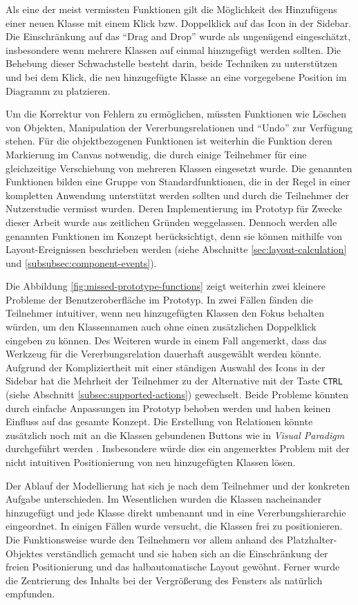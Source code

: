 Als eine der meist vermissten Funktionen gilt die Möglichkeit des Hinzufügens einer neuen Klasse mit einem Klick bzw. Doppelklick auf das Icon in der Sidebar. Die Einschränkung auf das \enquote{Drag and Drop} wurde als ungenügend eingeschätzt, insbesondere wenn mehrere Klassen auf einmal hinzugefügt werden sollten. Die Behebung dieser Schwachstelle besteht darin, beide Techniken zu unterstützen und bei dem Klick, die neu hinzugefügte Klasse an eine vorgegebene Position im Diagramm zu platzieren.

Um die Korrektur von Fehlern zu ermöglichen, müssten Funktionen wie Löschen von Objekten, Manipulation der Vererbungsrelationen und \enquote{Undo} zur Verfügung stehen. Für die objektbezogenen Funktionen ist weiterhin die Funktion deren Markierung im Canvas notwendig, die durch einige Teilnehmer für eine gleichzeitige Verschiebung von mehreren Klassen eingesetzt wurde. Die genannten Funktionen bilden eine Gruppe von Standardfunktionen, die in der Regel in einer kompletten Anwendung unterstützt werden sollten und durch die Teilnehmer der Nutzerstudie vermisst wurden. Deren Implementierung im Prototyp für Zwecke dieser Arbeit wurde aus zeitlichen Gründen weggelassen. Dennoch werden alle genannten Funktionen im Konzept berücksichtigt, denn sie können mithilfe von Layout-Ereignissen beschrieben werden (siehe Abschnitte \ref{sec:layout-calculation} und \ref{subsubsec:component-events}).

Die Abbildung \ref{fig:missed-prototype-functions} zeigt weiterhin zwei kleinere Probleme der Benutzeroberfläche im Prototyp. In zwei Fällen fänden die Teilnehmer intuitiver, wenn neu hinzugefügten Klassen den Fokus behalten würden, um den Klassennamen auch ohne einen zusätzlichen Doppelklick eingeben zu können. Des Weiteren wurde in einem Fall angemerkt, dass das Werkzeug für die Vererbungsrelation dauerhaft ausgewählt werden könnte. Aufgrund der Kompliziertheit mit einer ständigen Auswahl des Icons in der Sidebar hat die Mehrheit der Teilnehmer zu der Alternative mit der Taste \texttt{CTRL} (siehe Abschnitt \ref{subsec:supported-actions}) gewechselt. Beide Probleme könnten durch einfache Anpassungen im Prototyp behoben werden und haben keinen Einfluss auf das gesamte Konzept. Die Erstellung von Relationen könnte zusätzlich noch mit an die Klassen gebundenen Buttons wie in \textit{Visual Paradigm} durchgeführt werden \cite{14Visual}. Insbesondere würde dies ein angemerktes Problem mit der nicht intuitiven Positionierung von neu hinzugefügten Klassen lösen.

Der Ablauf der Modellierung hat sich je nach dem Teilnehmer und der konkreten Aufgabe unterschieden. Im Wesentlichen wurden die Klassen nacheinander hinzugefügt und jede Klasse direkt umbenannt und in eine Vererbungshierarchie eingeordnet. In einigen Fällen wurde versucht, die Klassen frei zu positionieren. Die Funktionsweise wurde den Teilnehmern vor allem anhand des Platzhalter-Objektes verständlich gemacht und sie haben sich an die Einschränkung der freien Positionierung und das halbautomatische Layout gewöhnt. Ferner wurde die Zentrierung des Inhalts bei der Vergrößerung des Fensters als natürlich empfunden.

